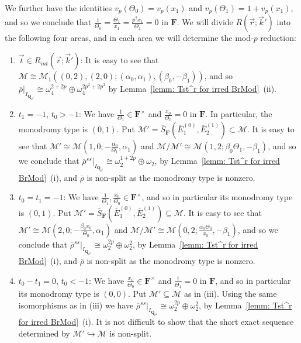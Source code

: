 \documentclass[11pt]{amsart}
\theoremstyle{definition}
\numberwithin{equation}{subsection}
\theoremstyle{plain}
\theoremstyle{plain}
\theoremstyle{plain}
\theoremstyle{plain}
\theoremstyle{plain}
\theoremstyle{plain}
\theoremstyle{plain}
\theoremstyle{plain}
\theoremstyle{plain}
\theoremstyle{plain}
\theoremstyle{plain}
\theoremstyle{plain}
\theoremstyle{definition}
\theoremstyle{definition}
\theoremstyle{definition}
\theoremstyle{remark}
\renewcommand{\(}{\textup{(}}
\renewcommand{\)}{\textup{)}}
\newcommand{\Q}{\mathbf{Q}}
\newcommand{\F}{\mathbf{F}}
\newcommand{\barS}{\overline{S}}
\newcommand{\rhobar}{\overline{\rho}}
\newcommand{\cM}{\mathcal{M}}
\newcommand{\barE}{\overline{E}}
\newcommand{\vr}{\vec{r}}
\newcommand{\vk}{\vec{k}}
\newcommand{\IQptwo}{{I_{\Q_{p^2}}}}
\begin{document}
We further have the identities $v_p(\Theta_0)=v_p(x_1)$ and $v_p(\Theta_1)=1+v_p(x_1)$, and so we conclude that $\frac{1}{\Theta_0}=\frac{\Theta_1}{x_1}=\frac{p^2x_1}{\Theta_1}=0$ in $\F$. We will divide $R(\vr;\vk')$ into the following four areas, and in each area we will determine the mod-$p$ reduction:
\begin{enumerate}[leftmargin=*]
  \item $\vec{t}\in R_{int}(\vr;\vk')$: It is easy to see that $\cM\cong\cM_1((0,2),(2,0);(\alpha_0,\alpha_1),(\beta_0,-\beta_1))$, and so $\rhobar|_\IQptwo\cong\omega_4^{2+2p}\oplus\omega_4^{2p^2+2p^3}$ by Lemma~\ref{lemm: Tst^r for irred BrMod}~(ii).
  \item $t_1=-1$, $t_0>-1$: We have $\frac{1}{\Theta_1}\in\F^\times$ and $\frac{x_0}{\Theta_0}=0$ in $\F$. In particular, the monodromy type is $(0,1)$. Put $\cM'=\barS_{\F}(\barE_1^{(0)},\barE_2^{(1)})\subset\cM$. It is easy to see that $\cM'\cong\cM(1,0;-\frac{\alpha_0}{\Theta_1},\alpha_1)$ and $\cM/\cM'\cong\cM(1,2;\beta_0\Theta_1,-\beta_1)$, and so we conclude that $\rhobar^{ss}|_\IQptwo\cong \omega_2^{1+2p}\oplus\omega_2$, by Lemma~\ref{lemm: Tst^r for irred BrMod}~(i), and $\rhobar$ is non-split as the monodromy type is nonzero.
  \item $t_0=t_1=-1$: We have $\frac{1}{\Theta_1},\frac{x_0}{\Theta_0}\in\F^\times$, and so in particular its monodromy type is $(0,1)$. Put $\cM'=\barS_{\F}(\barE_1^{(0)},\barE_2^{(1)})\subseteq\cM$. It is easy to see that $\cM'\cong\cM(2,0;-\frac{\beta_0x_0}{\Theta_0},\alpha_1)$ and $\cM/\cM'\cong\cM(0,2;\frac{\alpha_0\Theta_0}{x_0},-\beta_1)$, and so we conclude that $\rhobar^{ss}|_\IQptwo \cong\omega_2^{2p}\oplus\omega_2^2$, by Lemma~\ref{lemm: Tst^r for irred BrMod}~(i), and $\rhobar$ is non-split as the monodromy type is nonzero.
  \item $t_0-t_1=0$, $t_0<-1$: We have $\frac{x_0}{\Theta_0}\in\F^\times$ and $\frac{1}{\Theta_1}=0$ in $\F$, and so in particular its monodromy type is $(0,0)$. Put $\cM'\subseteq \cM$ as in (iii). Using the same isomorphisms as in (iii) we have $\rhobar^{ss}|_\IQptwo \cong\omega_2^{2p}\oplus\omega_2^2$, by Lemma~\ref{lemm: Tst^r for irred BrMod}~(i). It is not difficult to show that the short exact sequence determined by $\cM'\hookrightarrow \cM$ is non-split.
\end{enumerate}
\end{document}
